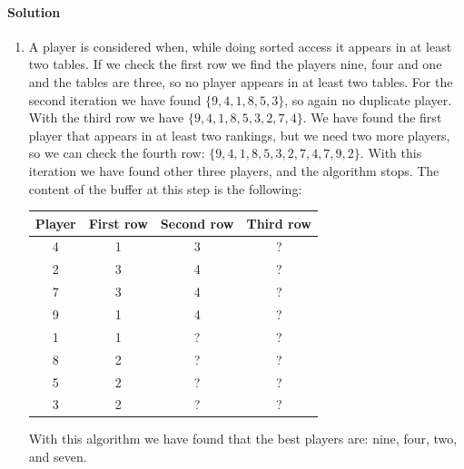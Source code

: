 \paragraph*{Solution}
\begin{enumerate}
    \item A player is considered when, while doing sorted access it appears in at least two tables. 
        If we check the first row we find the  players nine, four and one and the tables are three, so no player appears in at least two tables. 
        For the second iteration we have found $\{9,4,1,8,5,3\}$, so again no duplicate player. 
        With the third row we have $\{9,4,1,8,5,3,2,7,4\}$. We have found the first player that appears in at least two rankings, but we need two more players, so we can check the fourth row: $\{9,4,1,8,5,3,2,7,4,7,9,2\}$. 
        With this iteration we have found other three players, and the algorithm stops.
        The content of the buffer at this step is the following: 
        \begin{table}[H]
            \centering
            \begin{tabular}{|c|ccc|}
            \hline
            \textbf{Player} & \textbf{First row} & \textbf{Second row} & \textbf{Third row} \\ \hline
            4               & 1                  & 3                   & ?                  \\
            2               & 3                  & 4                   & ?                  \\
            7               & 3                  & 4                   & ?                  \\ 
            9               & 1                  & 4                   & ?                  \\
            1               & 1                  & ?                   & ?                  \\
            8               & 2                  & ?                   & ?                  \\
            5               & 2                  & ?                   & ?                  \\
            3               & 2                  & ?                   & ?                  \\ \hline
            \end{tabular}
        \end{table}
        With this algorithm we have found that the best players are: nine, four, two, and seven. 

\end{enumerate}

